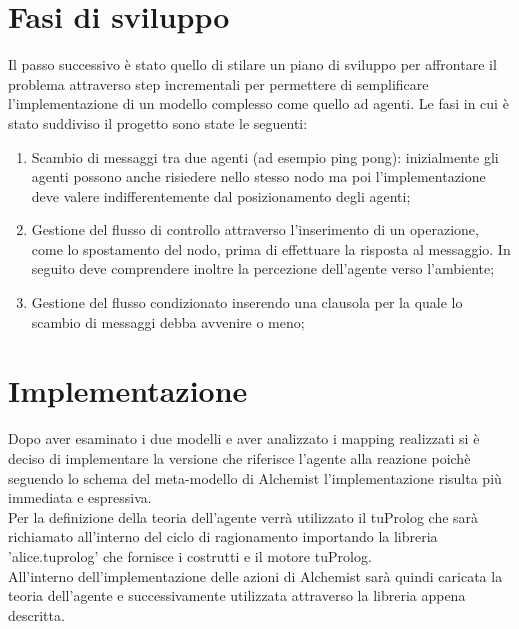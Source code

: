 \documentclass[12pt,a4paper,openright,twoside]{report}
\begin{document}
\section{Fasi di sviluppo}
Il passo successivo \`e stato quello di stilare un piano di sviluppo per affrontare il problema attraverso step incrementali per permettere di semplificare l'implementazione di un modello complesso come quello ad agenti. Le fasi in cui \`e stato suddiviso il progetto sono state le seguenti:
\begin{enumerate}
\item Scambio di messaggi tra due agenti (ad esempio ping pong): inizialmente gli agenti possono anche risiedere nello stesso nodo ma poi l'implementazione deve valere indifferentemente dal posizionamento degli agenti;
\item Gestione del flusso di controllo attraverso l'inserimento di un operazione, come lo spostamento del nodo, prima di effettuare la risposta al messaggio. In seguito deve comprendere inoltre la percezione dell'agente verso l'ambiente;
\item Gestione del flusso condizionato inserendo una clausola per la quale lo scambio di messaggi debba avvenire o meno;
\end{enumerate}

\section{Implementazione}

Dopo aver esaminato i due modelli e aver analizzato i mapping realizzati si \`e deciso di implementare la versione che riferisce l'agente alla reazione poich\`e seguendo lo schema del meta-modello di Alchemist l'implementazione risulta pi\`u immediata e espressiva.
\\
Per la definizione della teoria dell'agente verr\`a utilizzato il tuProlog che sar\`a richiamato all'interno del ciclo di ragionamento importando la libreria 'alice.tuprolog' che fornisce i costrutti e il motore tuProlog.
\\
All'interno dell'implementazione delle azioni di Alchemist sar\`a quindi caricata la teoria dell'agente e successivamente utilizzata attraverso la libreria appena descritta.
\end{document}
